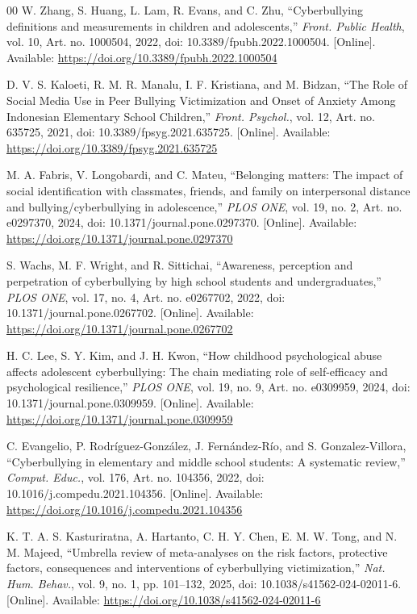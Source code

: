 \documentclass[conference]{IEEEtran}
\begin{document}
\begin{thebibliography}{00}
W. Zhang, S. Huang, L. Lam, R. Evans, and C. Zhu, ``Cyberbullying definitions and measurements in children and adolescents,'' \textit{Front. Public Health}, vol. 10, Art. no. 1000504, 2022, doi: 10.3389/fpubh.2022.1000504. [Online]. Available: \url{https://doi.org/10.3389/fpubh.2022.1000504}

D. V. S. Kaloeti, R. M. R. Manalu, I. F. Kristiana, and M. Bidzan, ``The Role of Social Media Use in Peer Bullying Victimization and Onset of Anxiety Among Indonesian Elementary School Children,'' \textit{Front. Psychol.}, vol. 12, Art. no. 635725, 2021, doi: 10.3389/fpsyg.2021.635725. [Online]. Available: \url{https://doi.org/10.3389/fpsyg.2021.635725}

M. A. Fabris, V. Longobardi, and C. Mateu, ``Belonging matters: The impact of social identification with classmates, friends, and family on interpersonal distance and bullying/cyberbullying in adolescence,'' \textit{PLOS ONE}, vol. 19, no. 2, Art. no. e0297370, 2024, doi: 10.1371/journal.pone.0297370. [Online]. Available: \url{https://doi.org/10.1371/journal.pone.0297370}

S. Wachs, M. F. Wright, and R. Sittichai, ``Awareness, perception and perpetration of cyberbullying by high school students and undergraduates,'' \textit{PLOS ONE}, vol. 17, no. 4, Art. no. e0267702, 2022, doi: 10.1371/journal.pone.0267702. [Online]. Available: \url{https://doi.org/10.1371/journal.pone.0267702}

H. C. Lee, S. Y. Kim, and J. H. Kwon, ``How childhood psychological abuse affects adolescent cyberbullying: The chain mediating role of self-efficacy and psychological resilience,'' \textit{PLOS ONE}, vol. 19, no. 9, Art. no. e0309959, 2024, doi: 10.1371/journal.pone.0309959. [Online]. Available: \url{https://doi.org/10.1371/journal.pone.0309959}

C. Evangelio, P. Rodríguez-González, J. Fernández-Río, and S. Gonzalez-Villora, ``Cyberbullying in elementary and middle school students: A systematic review,'' \textit{Comput. Educ.}, vol. 176, Art. no. 104356, 2022, doi: 10.1016/j.compedu.2021.104356. [Online]. Available: \url{https://doi.org/10.1016/j.compedu.2021.104356}

K. T. A. S. Kasturiratna, A. Hartanto, C. H. Y. Chen, E. M. W. Tong, and N. M. Majeed, ``Umbrella review of meta-analyses on the risk factors, protective factors, consequences and interventions of cyberbullying victimization,'' \textit{Nat. Hum. Behav.}, vol. 9, no. 1, pp. 101--132, 2025, doi: 10.1038/s41562-024-02011-6. [Online]. Available: \url{https://doi.org/10.1038/s41562-024-02011-6}


\end{thebibliography}
\end{document}
